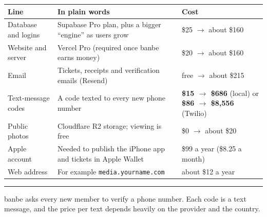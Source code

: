 \documentclass[11pt,a4paper]{article}
\newcommand{\sectionhead}[1]{\Needspace{15\baselineskip}\vspace{10pt}{\Large\bfseries #1}\par\vspace{-2pt}\textcolor{gold}{\rule{28mm}{2.2pt}}\par\vspace{4pt}}
\begin{document}
\begin{tabular}{@{}p{38mm}p{70mm}p{54mm}@{}}
\toprule
\textbf{Line} & \textbf{In plain words} & \textbf{Cost} \\
\midrule
Database and logins & Supabase Pro plan, plus a bigger ``engine'' as users grow & \$25 $\rightarrow$ about \$160 \\
Website and server & Vercel Pro (required once banbe earns money) & \$20 $\rightarrow$ about \$160 \\
Email & Tickets, receipts and verification emails (Resend) & free $\rightarrow$ about \$215 \\
Text-message codes & A code texted to every new phone number & \textbf{\$15 $\rightarrow$ \$686} (local) or \textbf{\$86 $\rightarrow$ \$8,556} (Twilio) \\
Public photos & Cloudflare R2 storage; viewing is free & \$0 $\rightarrow$ about \$20 \\
Apple account & Needed to publish the iPhone app and tickets in Apple Wallet & \$99 a year (\$8.25 a month) \\
Web address & For example \texttt{media.yourname.com} & about \$12 a year \\
\bottomrule
\end{tabular}

\sectionhead{4. The one decision that changes the bill: text-message codes}

banbe asks every new member to verify a phone number. Each code is a text message, and the price per text depends heavily on the provider and the country.

\begin{center}
\end{center}
\end{document}
